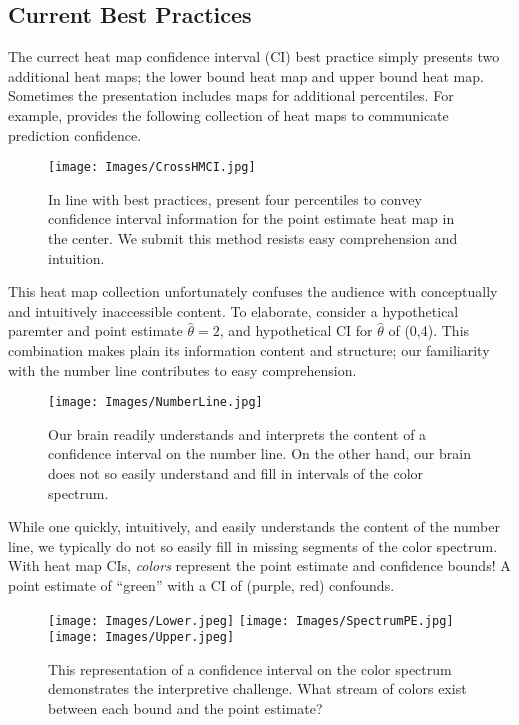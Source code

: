 \subsection{Current Best Practices}

The currect heat map confidence interval (CI) best practice simply presents two additional heat maps; the lower bound heat map and upper bound heat map. Sometimes the presentation includes maps for additional percentiles. For example, \cite{Cross2015} provides the following collection of heat maps to communicate prediction confidence.

  \begin{figure}[H]
	\texttt{[image: Images/CrossHMCI.jpg]}
	\caption{In line with best practices, \cite{Cross2015} present four percentiles to convey confidence interval information for the point estimate heat map in the center. We submit this method resists easy comprehension and intuition.}
	\end{figure}

This heat map collection unfortunately confuses the audience with conceptually and intuitively inaccessible content. To elaborate, consider a hypothetical paremter and point estimate $\hat{\theta} = 2$, and hypothetical CI for $\hat{\theta}$ of (0,4). This combination makes plain its information content and structure; our familiarity with the number line contributes to easy comprehension.
  \begin{figure}[H]
  \centering
	\texttt{[image: Images/NumberLine.jpg]}
	\caption{Our brain readily understands and interprets the content of a confidence interval on the number line. On the other hand, our brain does not so easily understand and fill in intervals of the color spectrum.}
	\end{figure}
While one quickly, intuitively, and easily understands the content of the number line, we typically do not so easily fill in missing segments of the color spectrum. With heat map CIs, {\it colors} represent the point estimate and confidence bounds! A point estimate of ``green'' with a CI of (purple, red) confounds.
  \begin{figure}[H]
  \centering
	\texttt{[image: Images/Lower.jpeg]}
	\texttt{[image: Images/SpectrumPE.jpg]}
	\texttt{[image: Images/Upper.jpeg]}
	\caption{This representation of a confidence interval on the color spectrum demonstrates the interpretive challenge. What stream of colors exist between each bound and the point estimate?}
	\end{figure}

